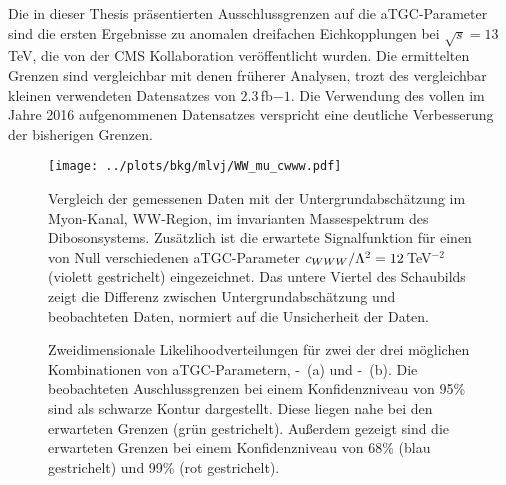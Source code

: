 Die in dieser Thesis präsentierten Ausschlussgrenzen auf die aTGC-Parameter sind die ersten Ergebnisse zu anomalen dreifachen Eichkopplungen bei $\sqrt{s}=13$\,TeV, die von der CMS Kollaboration veröffentlicht wurden. Die ermittelten Grenzen sind vergleichbar mit denen früherer Analysen, trozt des vergleichbar kleinen verwendeten Datensatzes von $2.3$\,fb${-1}$. Die Verwendung des vollen im Jahre 2016 aufgenommenen Datensatzes verspricht eine deutliche Verbesserung der bisherigen Grenzen.


\begin{figure}
    \centering
    \resizebox{0.8\columnwidth}{!}
    {%
    \texttt{[image: ../plots/bkg/mlvj/WW\_mu\_cwww.pdf]}
    \caption[Vergleich der gemessenen Daten mit der Untergrundabschätzung sowie zweidimensionale Ausschlussgrenzen auf \Tccw -\Tcb]{Vergleich der gemessenen Daten mit der Untergrundabschätzung im Myon-Kanal, WW-Region, im invarianten Massespektrum des Dibosonsystems. Zusätzlich ist die erwartete Signalfunktion für einen von Null verschiedenen aTGC-Parameter $c_{WWW}/\Lambda^2=12$\,TeV$^{-2}$ (violett gestrichelt) eingezeichnet. Das untere Viertel des Schaubilds zeigt die Differenz zwischen Untergrundabschätzung und beobachteten Daten, normiert auf die Unsicherheit der Daten.}
    \label{fig:intro_ger:WW}
    }
\end{figure}

\begin{figure}
	\centering
	\caption[Zweidimensionale Likelihoodverteilungen für zwei mögliche Kombinationen von aTGC-Parametern]{Zweidimensionale Likelihoodverteilungen für zwei der drei möglichen Kombinationen von aTGC-Parametern, \Tcwww -\Tcb \ (a) und \Tccw -\Tcb \ (b). Die beobachteten Auschlussgrenzen bei einem Konfidenzniveau von 95\% sind als schwarze Kontur dargestellt. Diese liegen nahe bei den erwarteten Grenzen (grün gestrichelt). Außerdem gezeigt sind die erwarteten Grenzen bei einem Konfidenzniveau von 68\% (blau gestrichelt) und 99\% (rot gestrichelt).}
	\label{fig:intro_ger:2d}	
\end{figure}

